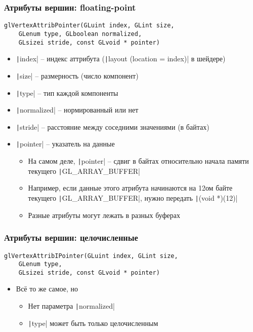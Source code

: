 \documentclass[10pt]{beamer}
\begin{document}
\begin{frame}[fragile]
\frametitle{Атрибуты вершин: floating-point}
\begin{verbatim}
glVertexAttribPointer(GLuint index, GLint size,
    GLenum type, GLboolean normalized,
    GLsizei stride, const GLvoid * pointer)
\end{verbatim}
\vspace*{-0.5cm}
\pause
{}
\begin{itemize}
\item \texttt|index| -- индекс аттрибута (\texttt|layout (location = index)| в шейдере)
\pause
\item \texttt|size| -- размерность (число компонент)
\pause
\item \texttt|type| -- тип каждой компоненты
\pause
\item \texttt|normalized| -- нормированный или нет
\pause
\item \texttt|stride| -- расстояние между соседними значениями (в байтах)
\pause
\item \texttt|pointer| -- указатель на данные
\pause
\begin{itemize}
\item На самом деле, \texttt|pointer| -- сдвиг в байтах относительно начала памяти текущего \texttt|GL_ARRAY_BUFFER|
\item Например, если данные этого атрибута начинаются на 12ом байте текущего \texttt|GL_ARRAY_BUFFER|, нужно передать \texttt|(void *)(12)|
\pause
\item Разные атрибуты могут лежать в разных буферах
\end{itemize}
\end{itemize}
\end{frame}

\begin{frame}[fragile]
\frametitle{Атрибуты вершин: целочисленные}
\begin{verbatim}
glVertexAttribIPointer(GLuint index, GLint size,
    GLenum type,
    GLsizei stride, const GLvoid * pointer)
\end{verbatim}
\vspace*{-0.5cm}
\begin{itemize}
\item Всё то же самое, но 
\begin{itemize}
\item Нет параметра \texttt|normalized|
\item \texttt|type| может быть только целочисленным
\end{itemize}
\end{itemize}
\end{frame}
\end{document}
